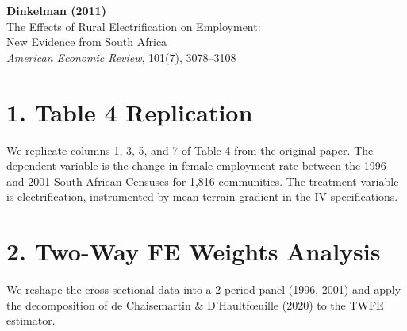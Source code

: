 \documentclass[12pt]{article}
\begin{document}
\begin{center}
{\Large\bfseries Dinkelman (2011)}\\
{\large The Effects of Rural Electrification on Employment:}\\
{\large New Evidence from South Africa}\\
\vspace{0.5em}
{\normalsize \textit{American Economic Review}, 101(7), 3078--3108}
\end{center}

\vspace{1em}

\section*{1. Table 4 Replication}

We replicate columns 1, 3, 5, and 7 of Table 4 from the original paper. 
The dependent variable is the change in female employment rate between 
the 1996 and 2001 South African Censuses for 1{,}816 communities. 
The treatment variable is electrification, instrumented by mean terrain 
gradient in the IV specifications.



\clearpage

\section*{2. Two-Way FE Weights Analysis}

We reshape the cross-sectional data into a 2-period panel 
(1996, 2001) and apply the decomposition of de Chaisemartin 
\& D'Haultf\oe uille (2020) to the TWFE estimator.


\end{document}
